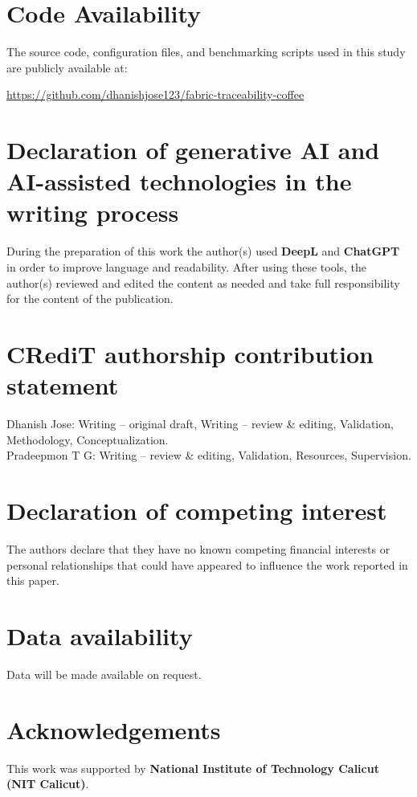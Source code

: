 \documentclass[12pt]{article}
\begin{document}
	\section*{Code Availability}
	
	The source code, configuration files, and benchmarking scripts used in this study are publicly available at:
	
	\url{https://github.com/dhanishjose123/fabric-traceability-coffee}
	
	
	\section*{Declaration of generative AI and AI-assisted technologies in the writing process}
	During the preparation of this work the author(s) used \textbf{DeepL} and \textbf{ChatGPT} in order to improve language and readability. 
	After using these tools, the author(s) reviewed and edited the content as needed and take full responsibility for the content of the publication.
	
	\section*{CRediT authorship contribution statement}
	Dhanish Jose: Writing – original draft, Writing – review \& editing, Validation, Methodology, Conceptualization.\\
	Pradeepmon T G: Writing – review \& editing, Validation, Resources, Supervision.
	
	
	\section*{Declaration of competing interest}
	The authors declare that they have no known competing financial interests or personal relationships 
	that could have appeared to influence the work reported in this paper.
	
	\section*{Data availability}
	Data will be made available on request.
	
	\section*{Acknowledgements}
	This work was supported by \textbf{National Institute of Technology Calicut (NIT Calicut)}.
	
\end{document}
